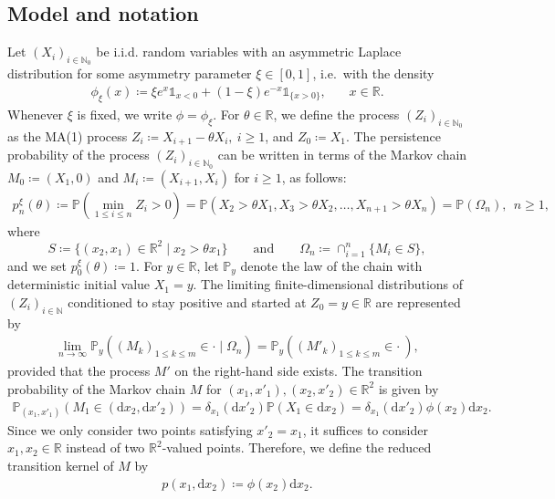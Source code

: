 \documentclass[12pt]{article}
\newcommand{\N}{\mathbb{N}} %
\newcommand{\R}{\mathbb{R}} %
\renewcommand{\P}{\mathbb{P}} %
\newcommand{\1}{\mathds{1}}
\renewcommand{\d}{\mathrm{d}}
\theoremstyle{definition}
\theoremstyle{plain}
\theoremstyle{remark}
\begin{document}
\subsection{Model and notation}
Let $(X_i)_{i\in\N_0}$ be i.i.d. random variables with an asymmetric Laplace distribution for some asymmetry parameter $\xi\in[0,1]$, i.e.\ with the density
\begin{align*}
   \phi_\xi( x)\coloneqq  \xi  e^x\mathds{1}_{x<0}+(1-\xi)e^{-x}\mathds{1}_{\{x>0\}},~~~~~~~~x\in\R.
\end{align*}
Whenever $\xi$ is fixed, we write $\phi=\phi_\xi$.
 For $\theta\in\R$, we define the process $(Z_i)_{i\in\N_0}$ as the MA(1) process
$Z_i\coloneqq X_{i+1}-\theta X_{i},~i\ge1$, and $Z_0\coloneqq X_1$.
The persistence probability of the process $(Z_i)_{i\in\N_0}$ can be written in terms of the Markov chain $M_0\coloneqq(X_1,0)$ and  $M_i\coloneqq(X_{i+1},X_i)$ for $i\geq 1$, as follows:
    \begin{align*}
   p_n^{\xi}(\theta)\coloneqq \P(\min_{1\leq i\leq n} Z_i> 0)=\P(X_2>\theta X_1,X_3>\theta X_2,\dots,X_{n+1}>\theta X_{n})=\P(\Omega_n),~~n\ge 1,
\end{align*}
where
$$
S\coloneqq \{(x_2,x_1)\in\R^2\mid x_2>\theta x_1\}\qquad\text{and}\qquad \Omega_n\coloneqq \cap_{i=1}^n\{M_i\in S\},
$$
and we set $p_0^{\xi}(\theta)\coloneqq1$. For $y\in\R$, let $\P_y$ denote the law of the chain with deterministic initial value $X_1=y$. The limiting finite-dimensional distributions of $(Z_i)_{i\in\N}$ conditioned to stay positive and started at $Z_0=y\in\R$ are represented by 
\begin{align}\label{def_lim_process}
    \lim_{n\to\infty}\P_y((M_k)_{1\leq k\leq m}\in\cdot\mid\Omega_n)=\P_y((M'_k)_{1\leq k\leq m}\in\cdot~),
\end{align}
provided that the process $M'$ on the right-hand side exists.
The transition probability of the Markov chain $M$ for $(x_1,x'_1),(x_2,x'_2)\in\R^2$ is given by
\begin{align*}
     \P_{(x_1,x'_1)}(M_1\in (\d x_2,\d x'_2))=\delta_{x_1}(\d x'_2)\P(X_1\in \d x_2)=\delta_{x_1}(\d x'_2)\phi(x_2)\d x_2.
\end{align*} 
Since we only consider two points satisfying $x'_2=x_1$, it suffices to consider $x_1, x_2\in \R$ instead of two $\R^2$-valued points. Therefore, we define the reduced transition kernel of $M$ by
   \begin{align*}
       p(x_1,\d x_2)\coloneqq \phi(x_2)\d x_2.
   \end{align*}
\end{document}
